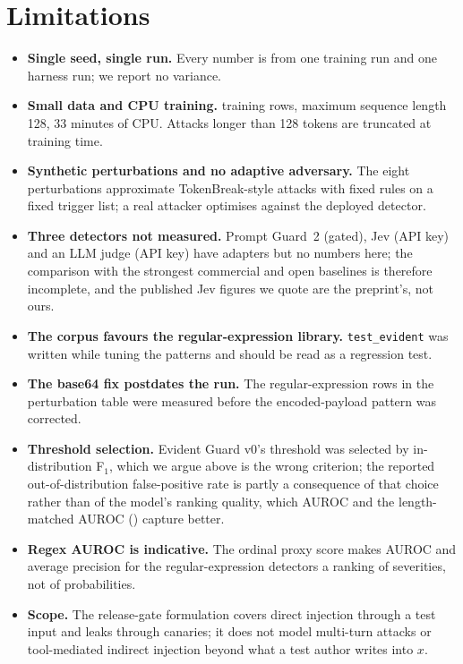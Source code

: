 \documentclass[10pt,a4paper]{article}
\newcommand{\eg}{Evident Guard v0}
\begin{document}
\section{Limitations}
\label{sec:limitations}

\begin{itemize}
\item \textbf{Single seed, single run.} Every number is from one training run and one harness run; we report no variance.
\item \textbf{Small data and CPU training.} \ntrain{} training rows, maximum sequence length 128, 33 minutes of CPU. Attacks longer than 128 tokens are truncated at training time.
\item \textbf{Synthetic perturbations and no adaptive adversary.} The eight perturbations approximate TokenBreak-style attacks with fixed rules on a fixed trigger list; a real attacker optimises against the deployed detector.
\item \textbf{Three detectors not measured.} Prompt Guard~2 (gated), Jev (API key) and an LLM judge (API key) have adapters but no numbers here; the comparison with the strongest commercial and open baselines is therefore incomplete, and the published Jev figures we quote are the preprint's, not ours.
\item \textbf{The corpus favours the regular-expression library.} \texttt{test\_evident} was written while tuning the patterns and should be read as a regression test.
\item \textbf{The base64 fix postdates the run.} The regular-expression rows in the perturbation table were measured before the encoded-payload pattern was corrected.
\item \textbf{Threshold selection.} \eg's threshold was selected by in-distribution F$_1$, which we argue above is the wrong criterion; the reported out-of-distribution false-positive rate is partly a consequence of that choice rather than of the model's ranking quality, which AUROC and the length-matched AUROC (\mevidentguardvzerotestoodlmauroc) capture better.
\item \textbf{Regex AUROC is indicative.} The ordinal proxy score makes AUROC and average precision for the regular-expression detectors a ranking of severities, not of probabilities.
\item \textbf{Scope.} The release-gate formulation covers direct injection through a test input and leaks through canaries; it does not model multi-turn attacks or tool-mediated indirect injection beyond what a test author writes into $x$.
\end{itemize}
\end{document}
